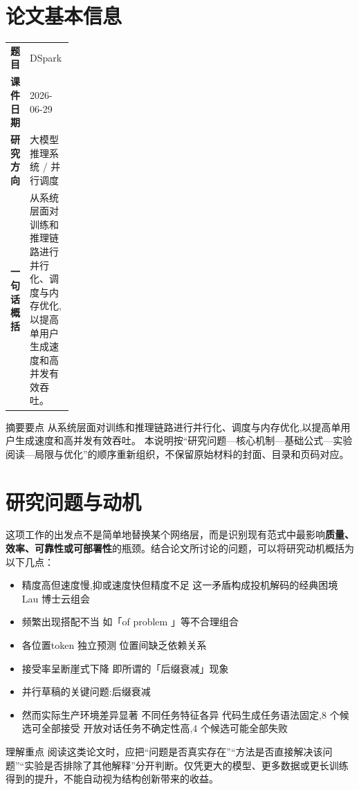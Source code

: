 \documentclass[UTF8,11pt,a4paper]{ctexart}
\newcommand{\term}[1]{\textbf{\textcolor{mainblue}{#1}}}
\begin{document}
\section{论文基本信息}
\begin{center}
\begin{tabularx}{0.94\linewidth}{>{\bfseries}p{0.18\linewidth}X}
\toprule
题目 & DSpark\\
课件日期 & 2026-06-29\\
研究方向 & 大模型推理系统 / 并行调度\\
一句话概括 & 从系统层面对训练和推理链路进行并行化、调度与内存优化,以提高单用户生成速度和高并发有效吞吐。\\
\bottomrule
\end{tabularx}
\end{center}

\begin{infobox}{摘要要点}
从系统层面对训练和推理链路进行并行化、调度与内存优化,以提高单用户生成速度和高并发有效吞吐。 本说明按“研究问题—核心机制—基础公式—实验阅读—局限与优化”的顺序重新组织，不保留原始材料的封面、目录和页码对应。
\end{infobox}

\section{研究问题与动机}
这项工作的出发点不是简单地替换某个网络层，而是识别现有范式中最影响\term{质量、效率、可靠性或可部署性}的瓶颈。结合论文所讨论的问题，可以将研究动机概括为以下几点：
\begin{itemize}
\item 精度高但速度慢,抑或速度快但精度不足 这一矛盾构成投机解码的经典困境 Lau 博士云组会
\item 频繁出现搭配不当 如「of problem 」等不合理组合
\item 各位置token 独立预测 位置间缺乏依赖关系
\item 接受率呈断崖式下降 即所谓的「后缀衰减」现象
\item 并行草稿的关键问题:后缀衰减
\item 然而实际生产环境差异显著 不同任务特征各异 代码生成任务语法固定,8 个候选可全部接受 开放对话任务不确定性高,4 个候选可能全部失败
\end{itemize}

\begin{notebox}{理解重点}
阅读这类论文时，应把“问题是否真实存在”“方法是否直接解决该问题”“实验是否排除了其他解释”分开判断。仅凭更大的模型、更多数据或更长训练得到的提升，不能自动视为结构创新带来的收益。
\end{notebox}
\end{document}

